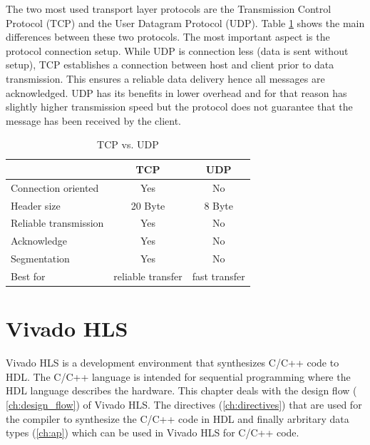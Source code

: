 The two most used transport layer protocols are the Transmission Control
Protocol (TCP) and the User Datagram Protocol (UDP). Table \ref{tab:tcpudp}
shows the main differences between these two protocols. The most important
aspect is the protocol connection setup. While UDP is connection less (data is
sent without setup), TCP establishes a connection between host and client
prior to data transmission. This ensures a reliable data delivery hence all
messages are acknowledged. UDP has its benefits in lower overhead and for that
reason has slightly higher transmission speed but the protocol does not
guarantee that the message has been received by the client.

\begin{table}[h]
    \centering
    \begin{tabular}{ l  c  c }
        \toprule
         & \textbf{TCP} & \textbf{UDP} \\
        \midrule
        Connection oriented & Yes & No \\
        Header size & 20 Byte & 8 Byte \\
        Reliable transmission & Yes & No \\
        Acknowledge & Yes & No \\
        Segmentation & Yes & No \\
        Best for & reliable transfer & fast transfer  \\
        \bottomrule
    \end{tabular}
    \caption{TCP vs. UDP}
    \label{tab:tcpudp}
\end{table}

\section{Vivado HLS} \label{ch:th:hls}
Vivado HLS is a development environment that synthesizes C/C++ code to HDL. The
C/C++ language is intended for sequential programming where the HDL language
describes the hardware. This chapter deals with the design flow (
\ref{ch:design_flow}) of Vivado HLS. The directives (\ref{ch:directives}) that
are used for the compiler to synthesize the C/C++ code in HDL and finally arbritary data types (\ref{ch:ap}) which can be used in Vivado HLS for C/C++ code.


